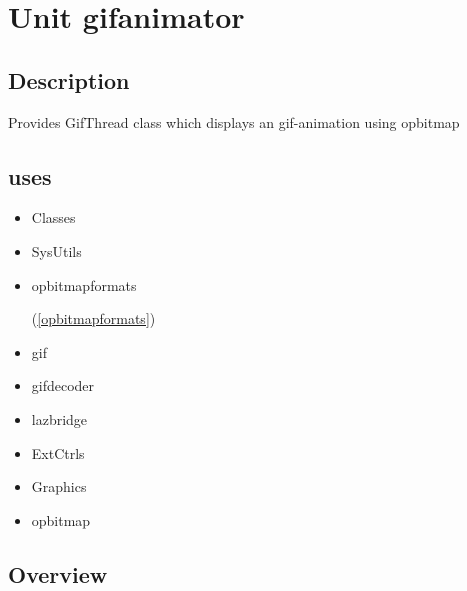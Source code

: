 \documentclass{report}
\begin{document}
\chapter{Unit gifanimator}
\label{gifanimator}
\section{Description}
Provides GifThread class which displays an gif{-}animation using opbitmap
\section{uses}
\begin{itemize}
\item \begin{ttfamily}Classes\end{ttfamily}\item \begin{ttfamily}SysUtils\end{ttfamily}\item \begin{ttfamily}opbitmapformats\end{ttfamily}(\ref{opbitmapformats})\item \begin{ttfamily}gif\end{ttfamily}\item \begin{ttfamily}gifdecoder\end{ttfamily}\item \begin{ttfamily}lazbridge\end{ttfamily}\item \begin{ttfamily}ExtCtrls\end{ttfamily}\item \begin{ttfamily}Graphics\end{ttfamily}\item \begin{ttfamily}opbitmap\end{ttfamily}\end{itemize}
\section{Overview}
\begin{description}
\item[\texttt{\begin{ttfamily}TGifThread\end{ttfamily} Class}]
\end{description}
\end{document}
